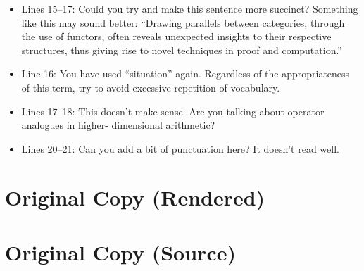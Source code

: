 \documentclass{article}
\newcommand{\originaltexfile}{matthew.tex}
\newcommand{\printoriginal}{%
        \clearpage
        \section*{Original Copy (Rendered)}
        \begin{linenumbers}
                
        \end{linenumbers}
        \section*{Original Copy (Source)}
        \inputminted{latex}{\originaltexfile}
}
\begin{document}
\begin{itemize}
        \item Lines 15--17: Could you try and make this sentence more succinct?
        Something like this may sound better: ``Drawing parallels between
        categories, through the use of functors, often reveals unexpected
        insights to their respective structures, thus giving rise to novel
        techniques in proof and computation.''

        \item Line 16: You have used ``situation'' again. Regardless of the
        appropriateness of this term, try to avoid excessive repetition of
        vocabulary.

        \item Lines 17--18: This doesn't make sense. Are you talking about
        operator analogues in higher- dimensional arithmetic?

        \item Lines 20--21: Can you add a bit of punctuation here? It doesn't
        read well.
\end{itemize}
\printoriginal
\end{document}
